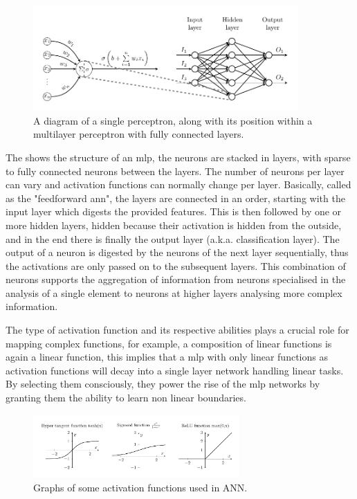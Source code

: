 \begin{figure}[H]
\centering
  \includegraphics[width=0.9\textwidth]{image/mlp_schema.pdf}
  \caption{A diagram of a single perceptron, along with its position within a multilayer perceptron with fully connected layers.}
  \label{fig:mlp_schema}
\end{figure}
The  shows the structure of an \gls{mlp}, the neurons are stacked in layers, with sparse to fully connected neurons between the layers. The number of neurons per layer can vary and activation functions can normally change per layer. Basically, called as the "feedforward \gls{ann}", the layers are connected in an order, starting with the input layer which digests the provided features. This is then followed by one or more hidden layers, hidden because their activation is hidden from the outside, and in the end there is finally the output layer (a.k.a. classification layer). The output of a neuron is digested by the neurons of the next layer sequentially, thus the activations are only passed on to the subsequent layers.
This combination of neurons supports the aggregation of information from neurons specialised in the analysis of a single element to neurons at higher layers analysing more complex information.

The type of activation function and its respective abilities plays a crucial role for mapping complex functions, for example, a composition of linear functions is again a linear function, this implies that a \gls{mlp} with only linear functions as activation functions will decay into a single layer network handling linear tasks.
By selecting them consciously, they power the rise of the \gls{mlp} networks by granting them the ability to learn non linear boundaries.

\begin{figure}[ht!]
\centering
  \includegraphics[width=0.7\textwidth]{image/activation_functions.pdf}\hfill
  \caption{Graphs of some activation functions used in ANN.}
  \label{fig:activation_functions}
\end{figure}

